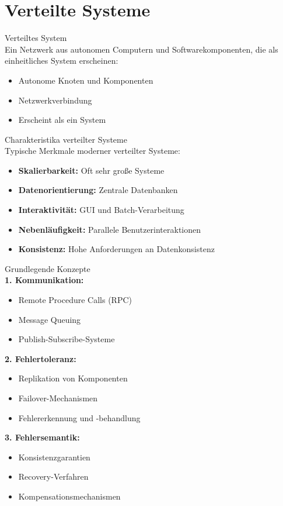 \section{Verteilte Systeme}

\begin{definition}{Verteiltes System}\\
Ein Netzwerk aus autonomen Computern und Softwarekomponenten, die als einheitliches System erscheinen:
\begin{itemize}
    \item Autonome Knoten und Komponenten
    \item Netzwerkverbindung
    \item Erscheint als ein System
\end{itemize}
\end{definition}

\begin{concept}{Charakteristika verteilter Systeme}\\
Typische Merkmale moderner verteilter Systeme:
\begin{itemize}
    \item \textbf{Skalierbarkeit:} Oft sehr große Systeme
    \item \textbf{Datenorientierung:} Zentrale Datenbanken
    \item \textbf{Interaktivität:} GUI und Batch-Verarbeitung
    \item \textbf{Nebenläufigkeit:} Parallele Benutzerinteraktionen
    \item \textbf{Konsistenz:} Hohe Anforderungen an Datenkonsistenz
\end{itemize}
\end{concept}

\begin{theorem}{Grundlegende Konzepte}\\
\textbf{1. Kommunikation:}
\begin{itemize}
    \item Remote Procedure Calls (RPC)
    \item Message Queuing
    \item Publish-Subscribe-Systeme
\end{itemize}

\textbf{2. Fehlertoleranz:}
\begin{itemize}
    \item Replikation von Komponenten
    \item Failover-Mechanismen
    \item Fehlererkennung und -behandlung
\end{itemize}

\textbf{3. Fehlersemantik:}
\begin{itemize}
    \item Konsistenzgarantien
    \item Recovery-Verfahren
    \item Kompensationsmechanismen
\end{itemize}
\end{theorem}

